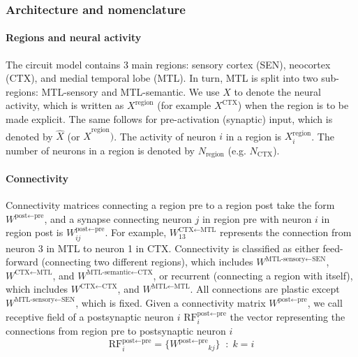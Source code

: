 \documentclass{article}
\begin{document}
\subsubsection*{Architecture and nomenclature}
\paragraph*{Regions and neural activity}
The circuit model contains 3 main regions: sensory cortex (SEN), neocortex (CTX), and medial temporal lobe (MTL). In turn, MTL is split into two sub-regions: MTL-sensory and MTL-semantic. We use $X$ to denote the neural activity, which is written as $X^\textrm{region}$ (for example $X^\textrm{CTX}$) when the region is to be made explicit. The same follows for pre-activation (synaptic) input, which is denoted by $\hat{X}$ (or $\hat{X}^\textrm{region})$. The activity of neuron $i$ in a region is $X^\textrm{region}_i$. The number of neurons in a region is denoted by $N_\textrm{region}$ (e.g. $N_\textrm{CTX}$).
\paragraph{Connectivity}
Connectivity matrices connecting a region \textrm{pre} to a region \textrm{post} take the form $W^{\textrm{post}\leftarrow\textrm{pre}}$, and a synapse connecting neuron $j$ in region pre with neuron $i$ in region post is $W^{\textrm{post}\leftarrow\textrm{pre}}_{ij}$. For example, $W^{\textrm{CTX}\leftarrow\textrm{MTL}}_{13}$ represents the connection from neuron 3 in MTL to neuron 1 in CTX. Connectivity is classified as either feed-forward (connecting two different regions), which includes  $W^{\textrm{MTL-sensory}\leftarrow\textrm{SEN}}$, $W^{\textrm{CTX}\leftarrow\textrm{MTL}}$, and $W^{\textrm{MTL-semantic}\leftarrow\textrm{CTX}}$, or recurrent (connecting a region with itself), which includes $W^{\textrm{CTX}\leftarrow\textrm{CTX}}$, and $W^{\textrm{MTL}\leftarrow\textrm{MTL}}$. All connections are plastic except $W^{\textrm{MTL-sensory}\leftarrow\textrm{SEN}}$, which is fixed. Given a connectivity matrix $W^{\textrm{post}\leftarrow\textrm{pre}}$, we call receptive field of a postsynaptic neuron $i$ $\textrm{RF}^{\textrm{post}\leftarrow\textrm{pre}}_i$ the vector representing the connections from region pre to postsynaptic neuron $i$
\begin{equation}
    \textrm{RF}^{\textrm{post}\leftarrow\textrm{pre}}_i = \{{W^{\textrm{post}\leftarrow\textrm{pre}}}_{kj}\} \;\; : \;k = i 
\end{equation}
\end{document}
